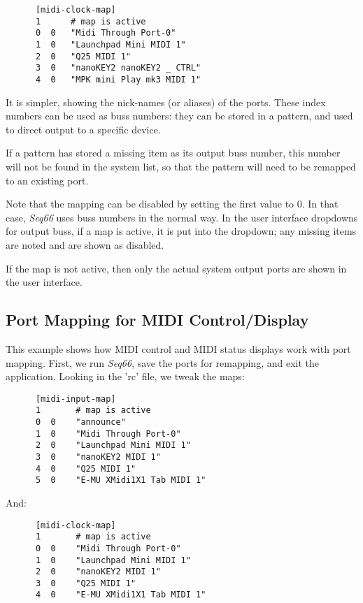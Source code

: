    \begin{verbatim}
      [midi-clock-map]
      1      # map is active
      0  0   "Midi Through Port-0"
      1  0   "Launchpad Mini MIDI 1"
      2  0   "Q25 MIDI 1"
      3  0   "nanoKEY2 nanoKEY2 _ CTRL"
      4  0   "MPK mini Play mk3 MIDI 1"
   \end{verbatim}
   
   It is simpler, showing the nick-names (or aliases) of the ports.
   These index numbers can be used as buss numbers: they can be stored
   in a pattern, and used to direct output to a specific device.

   If a pattern has stored a missing item as its output
   buss number, this number will not be found in the system list, so that the
   pattern will need to be remapped to an existing port.

   Note that the mapping can be disabled by setting the first value to 0.  In
   that case, \textsl{Seq66} uses buss numbers in the normal way.
   In the user interface dropdowns for output buss, if a map is active, it is
   put into the dropdown; any missing items are noted and are shown as
   disabled.

   If the map is not active, then only the actual system output ports are
   shown in the user interface.

\subsection{Port Mapping for MIDI Control/Display}
\label{subsec:input_port_mapping_example}

   This example shows how MIDI control and MIDI status displays work with
   port mapping.  First, we run \textsl{Seq66}, save the ports for
   remapping, and exit the application.  Looking in the 'rc' file, we tweak
   the maps:

   \begin{verbatim}
      [midi-input-map]
      1       # map is active
      0  0    "announce"
      1  0    "Midi Through Port-0"
      2  0    "Launchpad Mini MIDI 1"
      3  0    "nanoKEY2 MIDI 1"
      4  0    "Q25 MIDI 1"
      5  0    "E-MU XMidi1X1 Tab MIDI 1"
   \end{verbatim}

   And:

   \begin{verbatim}
      [midi-clock-map]
      1       # map is active
      0  0    "Midi Through Port-0"
      1  0    "Launchpad Mini MIDI 1"
      2  0    "nanoKEY2 MIDI 1"
      3  0    "Q25 MIDI 1"
      4  0    "E-MU XMidi1X1 Tab MIDI 1"
   \end{verbatim}

